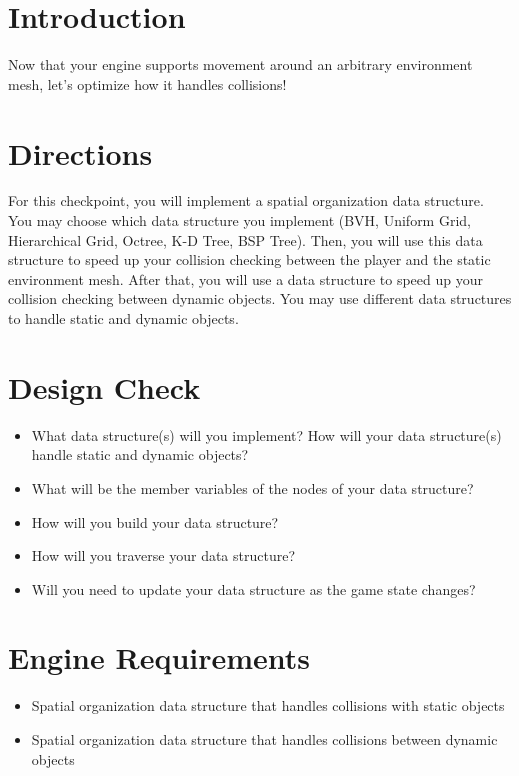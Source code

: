 \documentclass{../cs195u}
\begin{document}
 \section*{Introduction}

Now that your engine supports movement around an arbitrary environment mesh, let's optimize how it handles collisions!


 \section*{Directions}
  
For this checkpoint, you will implement a spatial organization data structure. You may choose which data structure you implement (BVH, Uniform Grid, Hierarchical Grid, Octree, K-D Tree, BSP Tree). Then, you will use this data structure to speed up your collision checking between the player and the static environment mesh. After that, you will use a data structure to speed up your collision checking between dynamic objects. You may use different data structures to handle static and dynamic objects.


  \section*{Design Check}
  \begin{itemize}
   \item What data structure(s) will you implement? How will your data structure(s) handle static and dynamic objects?
   \item What will be the member variables of the nodes of your data structure?
   \item How will you build your data structure?
   \item How will you traverse your data structure?
   \item Will you need to update your data structure as the game state changes?
  \end{itemize}

  \section*{Engine Requirements}
  \begin{itemize}
    \item Spatial organization data structure that handles collisions with static objects
    \item Spatial organization data structure that handles collisions between dynamic objects 
 \end{itemize}
 
\end{document}
